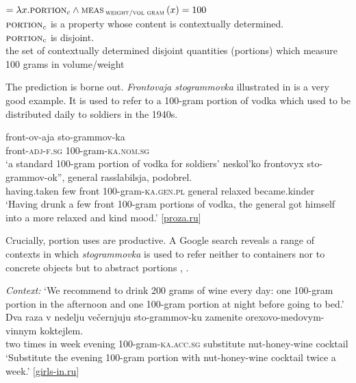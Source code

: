 \documentclass[output=paper]{langscibook}
\begin{document}
\ea\label{ex:khrizmann:37}  $= \lambda x.\textsc{portion}_{c} \wedge \textsc{meas}\,_{\textsc{weight/vol gram}}\,(x) = 100$\\
\hspace{.9em} {\small $\textsc{portion}_{c}$ is a property whose content is contextually determined.\\
\hspace{1em} $\textsc{portion}\textsubscript{c}$ is disjoint.\\
the set of contextually determined disjoint quantities (portions) which measure 100 grams in volume/weight}
\z

\noindent The prediction is borne out. \textit{Frontovaja stogrammovka} illustrated in  is a very good example. It is used to refer to a 100-gram portion of vodka which used to be distributed daily to soldiers in the 1940s.

\ea\label{ex:khrizmann:38}
    \ea \gll front-ov-aja sto-grammov-ka\\
    front-\textsc{adj-f.sg} 100-gram-\textsc{ka.nom.sg}\\
    \glt `a standard 100-gram portion of vodka for soldiers'
    \ex {} neskol'ko  frontovyx sto-grammov-ok'', general rasslabilsja, podobrel.\\
    having.taken few {} front 100-gram-\textsc{ka.gen.pl} general relaxed became.kinder\\
    \glt `Having drunk a few front 100-gram portions of vodka, the general got himself into a more relaxed and kind mood.' \hfill [\href{https://www.proza.ru/2012/07/06/1250}{proza.ru}]
\z\z

\noindent Crucially, portion uses are productive. A Google search reveals a range of contexts in which \textit{stogrammovka} is used to refer neither to containers nor to concrete objects but to abstract portions , .

\ea\label{ex:khrizmann:39} \textit{Context:} `We recommend to drink 200 grams of wine every day: one 100-gram portion in the afternoon and one 100-gram portion at night before going to bed.'\\
\gll Dva raza v nedelju večernjuju sto-grammov-ku zamenite orexovo-medovym-vinnym koktejlem.\\
two times in week evening 100-gram-\textsc{ka.acc.sg} substitute nut-honey-wine cocktail\\
\glt `Substitute the evening 100-gram portion with nut-honey-wine cocktail twice a week.' \hfill [\href{http://girls-in.ru/pub/1320}{girls-in.ru}]
\z
\end{document}
